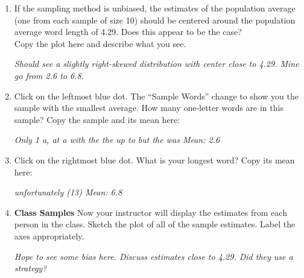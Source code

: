 \begin{enumerate}
\item \label{3000SRSs} If the sampling method is unbiased, the
  estimates of the population average (one from each sample of size
  10) should be centered around the population average word length of
  4.29.
  Does this appear to be the case? \\
  Copy the plot here and describe what you see.
\begin{students}
  \vspace{3cm}
\end{students}    
\begin{key}
   {\it Should see a slightly right-skewed distribution with center
     close to 4.29.  Mine go from 2.6 to 6.8. }
\end{key}

     \item  Click on the leftmost blue dot. The ``Sample Words''
       change to show you the sample with the smallest average. How
       many one-letter words are in this sample?  Copy the sample and
       its mean here:
\begin{students}
  \vspace{1cm}
\end{students}    
\begin{key}
   {\it Only 1 {\sf a, at a with the the up to but the was}   Mean: 2.6}
\end{key}
     \item  Click on the rightmost blue dot. What is your longest
       word?   Copy  its mean here:
\begin{students}
  \vspace{1cm}
\end{students}    
\begin{key}
   {\it {\sf unfortunately} (13) Mean: 6.8}
\end{key}


     \item\label{classPlot} {\bf Class Samples} Now your instructor will
       display the  estimates from each person in the class. 
        Sketch the plot of all of the sample estimates. 
        Label the axes appropriately.       
\begin{students}
  \vspace{4cm}
\end{students}    
\begin{key}
   {\it Hope to see some bias here.  Discuss estimates close to
     4.29. Did they use a strategy?}
\end{key}


\end{enumerate}
